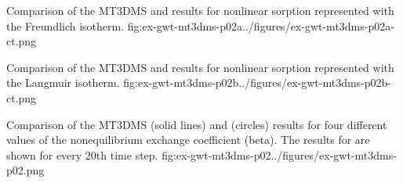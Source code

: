 \begin{StandardFigure}
	{Comparison of the MT3DMS and \mf results for nonlinear sorption represented with the Freundlich isotherm.}
	{fig:ex-gwt-mt3dms-p02a}{../figures/ex-gwt-mt3dms-p02a-ct.png}
\end{StandardFigure}

\begin{StandardFigure}
	{Comparison of the MT3DMS and \mf results for nonlinear sorption represented with the Langmuir isotherm.}
	{fig:ex-gwt-mt3dms-p02b}{../figures/ex-gwt-mt3dms-p02b-ct.png}
\end{StandardFigure}

\begin{StandardFigure}
	{Comparison of the MT3DMS (solid lines) and \mf (circles) results for four different values of the nonequilibrium exchange coefficient (beta).  The results for \mf are shown for every 20th time step.}
	{fig:ex-gwt-mt3dms-p02}{../figures/ex-gwt-mt3dms-p02.png}
\end{StandardFigure}



